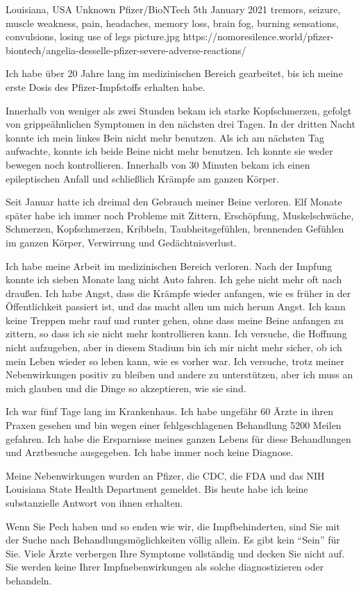           {Louisiana, USA}
          {Unknown}
          {Pfizer/BioNTech}
          {5th January 2021}          
          {tremors, seizure, muscle weakness, pain, headaches, memory loss, brain
            fog, burning sensations, convulsions, losing use of legs }
          {picture.jpg}
          {https://nomoresilence.world/pfizer-biontech/angelia-desselle-pfizer-severe-adverse-reactions/}
          {

Ich habe über 20 Jahre lang im medizinischen Bereich gearbeitet, bis ich meine
erste Dosis des Pfizer-Impfstoffs erhalten habe.

Innerhalb von weniger als zwei Stunden bekam ich starke Kopfschmerzen, gefolgt
von grippeähnlichen Symptomen in den nächsten drei Tagen. In der dritten Nacht
konnte ich mein linkes Bein nicht mehr benutzen. Als ich am nächsten Tag
aufwachte, konnte ich beide Beine nicht mehr benutzen. Ich konnte sie weder
bewegen noch kontrollieren. Innerhalb von 30 Minuten bekam ich einen
epileptischen Anfall und schließlich Krämpfe am ganzen Körper.

Seit Januar hatte ich dreimal den Gebrauch meiner Beine verloren. Elf Monate
später habe ich immer noch Probleme mit Zittern, Erschöpfung, Muskelschwäche,
Schmerzen, Kopfschmerzen, Kribbeln, Taubheitsgefühlen, brennenden Gefühlen im
ganzen Körper, Verwirrung und Gedächtnisverlust.

Ich habe meine Arbeit im medizinischen Bereich verloren. Nach der Impfung konnte
ich sieben Monate lang nicht Auto fahren. Ich gehe nicht mehr oft nach
draußen. Ich habe Angst, dass die Krämpfe wieder anfangen, wie es früher in der
Öffentlichkeit passiert ist, und das macht allen um mich herum Angst. Ich kann
keine Treppen mehr rauf und runter gehen, ohne dass meine Beine anfangen zu
zittern, so dass ich sie nicht mehr kontrollieren kann. Ich versuche, die
Hoffnung nicht aufzugeben, aber in diesem Stadium bin ich mir nicht mehr sicher,
ob ich mein Leben wieder so leben kann, wie es vorher war. Ich versuche, trotz
meiner Nebenwirkungen positiv zu bleiben und andere zu unterstützen, aber ich
muss an mich glauben und die Dinge so akzeptieren, wie sie sind.

Ich war fünf Tage lang im Krankenhaus. Ich habe ungefähr 60 Ärzte in ihren
Praxen gesehen und bin wegen einer fehlgeschlagenen Behandlung 5200 Meilen
gefahren. Ich habe die Ersparnisse meines ganzen Lebens für diese Behandlungen
und Arztbesuche ausgegeben. Ich habe immer noch keine Diagnose.

Meine Nebenwirkungen wurden an Pfizer, die CDC, die FDA und das NIH Louisiana
State Health Department gemeldet. Bis heute habe ich keine substanzielle Antwort
von ihnen erhalten.

Wenn Sie Pech haben und so enden wie wir, die Impfbehinderten, sind Sie mit der
Suche nach Behandlungsmöglichkeiten völlig allein. Es gibt kein ``Sein'' für
Sie. Viele Ärzte verbergen Ihre Symptome vollständig und decken Sie nicht
auf. Sie werden keine Ihrer Impfnebenwirkungen als solche diagnostizieren oder
behandeln.

}
